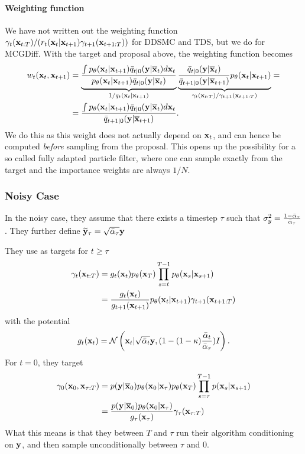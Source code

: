 \paragraph{Weighting function}
We have not written out the weighting function $\gamma_t(\mathbf{x}_{t:T}) / (r_t(\mathbf{x}_{t}|\mathbf{x}_{t+1})\gamma_{t+1}(\mathbf{x}_{t+1:T}))$ for DDSMC and TDS, but we do for MCGDiff. With the target and proposal above, the weighting function becomes
\begin{align}
    w_t(\mathbf{x}_{t},\mathbf{x}_{t+1}) &= \underbrace{\frac{\int p_\theta(\mathbf{x}_{t}|\mathbf{x}_{t+1})\bar q_{t|0}(\mathbf{y}|\overline{\mathbf{x}}_t) d\mathbf{x}_{t}} {p_\theta(\mathbf{x}_{t}|\mathbf{x}_{t+1})\bar q_{t|0}(\mathbf{y}|\overline{\mathbf{x}}_t)} }_{1/q_t(\mathbf{x}_{t}|\mathbf{x}_{t+1})}
    \underbrace{
    \frac{\bar q_{t|0}(\mathbf{y}|\overline{\mathbf{x}}_t)}{\bar q_{t+1|0}(\mathbf{y}|\overline{\mathbf{x}}_{t+1})}p_\theta(\mathbf{x}_{t}|\mathbf{x}_{t+1})
    }_{\gamma_t(\mathbf{x}_{t:T})/\gamma_{t+1}(\mathbf{x}_{t+1:T})} = \\
    &= \frac{\int p_\theta(\mathbf{x}_{t}|\mathbf{x}_{t+1})\bar q_{t|0}(\mathbf{y}|\overline{\mathbf{x}}_t) d\mathbf{x}_{t}}{\bar q_{t+1|0}(\mathbf{y}|\overline{\mathbf{x}}_{t+1})}.
\end{align}
We do this as this weight does not actually depend on $\mathbf{x}_{t}$, and can hence be computed \emph{before} sampling from the proposal. This opens up the possibility for a so called fully adapted particle filter, where one can sample exactly from the target and the importance weights are always $1/N$.

\subsubsection{Noisy Case}
In the noisy case, they assume that there exists a timestep $\tau$ such that $\sigma_y^2 = \frac{1-\bar\alpha_\tau}{\bar\alpha_\tau}$. They further define $\widetilde {\mathbf{y}}_\tau = \sqrt{\bar\alpha_\tau} \mathbf{y}$

They use as targets for $t\geq\tau$
\begin{align}
    \gamma_t(\mathbf{x}_{t:T}) 
    &= g_t(\mathbf{x}_{t})p_\theta(\mathbf{x}_T)\prod_{s=t}^{T-1}p_\theta(\mathbf{x}_s|\mathbf{x}_{s+1}) \\
    &= \frac{g_t(\mathbf{x}_{t})}{g_{t+1}(\mathbf{x}_{t+1})}p_\theta(\mathbf{x}_{t}|\mathbf{x}_{t+1})\gamma_{t+1}(\mathbf{x}_{t+1:T})
\end{align}
with the potential
\begin{align}
    g_t(\mathbf{x}_{t}) = \mathcal{N}\left(\mathbf{x}_{t}|\sqrt{\bar\alpha_t}\mathbf{y}, (1-(1-\kappa)\frac{\bar\alpha_t}{\bar\alpha_\tau})I\right).
\end{align}
For $t=0$, they target
\begin{align}
    \gamma_0(\mathbf{x}_0, \mathbf{x}_{\tau:T}) 
    &= p(\mathbf{y}|\overline{\mathbf{x}}_0)p_\theta(\mathbf{x}_0|\mathbf{x}_\tau)p_\theta(\mathbf{x}_T)\prod_{s=\tau}^{T-1}p(\mathbf{x}_s|\mathbf{x}_{s+1}) \\
    &= \frac{p(\mathbf{y}|\overline{\mathbf{x}}_0)p_\theta(\mathbf{x}_0|\mathbf{x}_\tau)}{g_\tau(\mathbf{x}_\tau)}\gamma_\tau(\mathbf{x}_{\tau:T})
\end{align}
What this means is that they between $T$ and $\tau$ run their algorithm conditioning on $\mathbf{y}$, and then sample unconditionally between $\tau$ and $0$.

